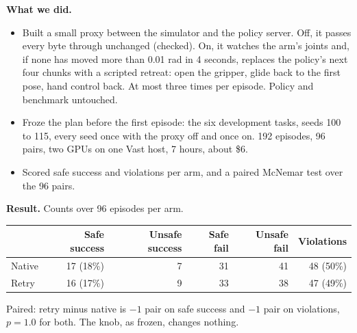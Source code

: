 \documentclass[11pt,a4paper]{article}
\begin{document}
\textbf{What we did.}
\begin{itemize}\setlength\itemsep{1pt}
  \item Built a small proxy between the simulator and the policy server. Off, it passes every byte through unchanged (checked). On, it watches the arm's joints and, if none has moved more than 0.01 rad in 4 seconds, replaces the policy's next four chunks with a scripted retreat: open the gripper, glide back to the first pose, hand control back. At most three times per episode. Policy and benchmark untouched.
  \item Froze the plan before the first episode: the six development tasks, seeds 100 to 115, every seed once with the proxy off and once on. 192 episodes, 96 pairs, two GPUs on one Vast host, 7 hours, about \$6.
  \item Scored safe success and violations per arm, and a paired McNemar test over the 96 pairs.
\end{itemize}

\textbf{Result.} Counts over 96 episodes per arm.

\begin{center}
\begin{tabular}{lrrrrr}
\toprule
 & Safe success & Unsafe success & Safe fail & Unsafe fail & Violations \\
\midrule
Native & 17 (18\%) & 7 & 31 & 41 & 48 (50\%) \\
Retry & 16 (17\%) & 9 & 33 & 38 & 47 (49\%) \\
\bottomrule
\end{tabular}
\end{center}

Paired: retry minus native is $-1$ pair on safe success and $-1$ pair on violations, $p = 1.0$ for both. The knob, as frozen, changes nothing.
\end{document}
